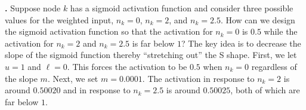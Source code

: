 \noindent
{\bf \theActFunctionCounter.} Suppose node $k$ has a sigmoid activation function and
consider three possible values for the weighted input, \ie $n_k=0$, $n_k = 2$, and
$n_k=2.5$. How can we design the sigmoid activation function so that the
activation for $n_k=0$ is $0.5$ while the activation for $n_k = 2$ and
$n_k=2.5$ is far below $1$?  The key idea is to decrease the slope of the
sigmoid function thereby ``stretching out'' the S shape. First, we let $u=1$
and $\ell=0$. This forces the activation to be $0.5$ when $n_k=0$ regardless
of the slope $m$. Next, we set $m=0.0001$. The activation in response to
$n_k=2$ is around $0.50020$ and in response to $n_k=2.5$ is around $0.50025$,
both of which are far below $1$.

\bigskip
